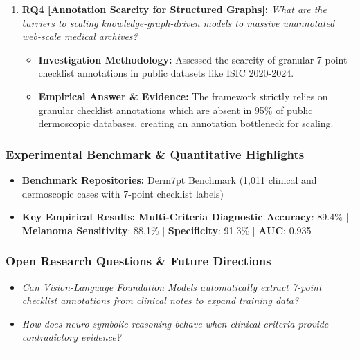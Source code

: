 \begin{enumerate}[label=\textbf{\arabic*.}, leftmargin=*]
\begin{itemize}[leftmargin=1.5em]
    \item \textbf{Empirical Answer \& Evidence:} Achieved a ROC-AUC of 0.935 for melanoma detection, matching specialist dermatologist consensus while maintaining transparent symbolic justifications.
  \end{itemize}
  \item \textbf{RQ4 [Annotation Scarcity for Structured Graphs]:} \textit{What are the barriers to scaling knowledge-graph-driven models to massive unannotated web-scale medical archives?}
  \begin{itemize}[leftmargin=1.5em]
    \item \textbf{Investigation Methodology:} Assessed the scarcity of granular 7-point checklist annotations in public datasets like ISIC 2020-2024.
    \item \textbf{Empirical Answer \& Evidence:} The framework strictly relies on granular checklist annotations which are absent in 95\% of public dermoscopic databases, creating an annotation bottleneck for scaling.
  \end{itemize}
\end{enumerate}

\subsubsection*{Experimental Benchmark \& Quantitative Highlights}
\begin{itemize}[leftmargin=*]
  \item \textbf{Benchmark Repositories:} Derm7pt Benchmark (1,011 clinical and dermoscopic cases with 7-point checklist labels)
  \item \textbf{Key Empirical Results:} \textbf{Multi-Criteria Diagnostic Accuracy}: 89.4\% \quad | \quad \textbf{Melanoma Sensitivity}: 88.1\% \quad | \quad \textbf{Specificity}: 91.3\% \quad | \quad \textbf{AUC}: 0.935
\end{itemize}

\subsubsection*{Open Research Questions \& Future Directions}
\begin{itemize}[leftmargin=*]
  \item \textit{Can Vision-Language Foundation Models automatically extract 7-point checklist annotations from clinical notes to expand training data?}
  \item \textit{How does neuro-symbolic reasoning behave when clinical criteria provide contradictory evidence?}
\end{itemize}
\vspace{0.8em}\hrule\vspace{1.2em}
